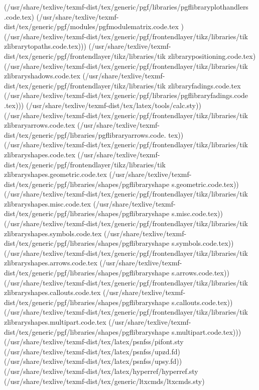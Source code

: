 (/usr/share/texlive/texmf-dist/tex/generic/pgf/libraries/pgflibraryplothandlers
.code.tex)
(/usr/share/texlive/texmf-dist/tex/generic/pgf/modules/pgfmodulematrix.code.tex
)
(/usr/share/texlive/texmf-dist/tex/generic/pgf/frontendlayer/tikz/libraries/tik
zlibrarytopaths.code.tex)))
(/usr/share/texlive/texmf-dist/tex/generic/pgf/frontendlayer/tikz/libraries/tik
zlibrarypositioning.code.tex)
(/usr/share/texlive/texmf-dist/tex/generic/pgf/frontendlayer/tikz/libraries/tik
zlibraryshadows.code.tex
(/usr/share/texlive/texmf-dist/tex/generic/pgf/frontendlayer/tikz/libraries/tik
zlibraryfadings.code.tex
(/usr/share/texlive/texmf-dist/tex/generic/pgf/libraries/pgflibraryfadings.code
.tex))) (/usr/share/texlive/texmf-dist/tex/latex/tools/calc.sty))
(/usr/share/texlive/texmf-dist/tex/generic/pgf/frontendlayer/tikz/libraries/tik
zlibraryarrows.code.tex
(/usr/share/texlive/texmf-dist/tex/generic/pgf/libraries/pgflibraryarrows.code.
tex))
(/usr/share/texlive/texmf-dist/tex/generic/pgf/frontendlayer/tikz/libraries/tik
zlibraryshapes.code.tex
(/usr/share/texlive/texmf-dist/tex/generic/pgf/frontendlayer/tikz/libraries/tik
zlibraryshapes.geometric.code.tex
(/usr/share/texlive/texmf-dist/tex/generic/pgf/libraries/shapes/pgflibraryshape
s.geometric.code.tex))
(/usr/share/texlive/texmf-dist/tex/generic/pgf/frontendlayer/tikz/libraries/tik
zlibraryshapes.misc.code.tex
(/usr/share/texlive/texmf-dist/tex/generic/pgf/libraries/shapes/pgflibraryshape
s.misc.code.tex))
(/usr/share/texlive/texmf-dist/tex/generic/pgf/frontendlayer/tikz/libraries/tik
zlibraryshapes.symbols.code.tex
(/usr/share/texlive/texmf-dist/tex/generic/pgf/libraries/shapes/pgflibraryshape
s.symbols.code.tex))
(/usr/share/texlive/texmf-dist/tex/generic/pgf/frontendlayer/tikz/libraries/tik
zlibraryshapes.arrows.code.tex
(/usr/share/texlive/texmf-dist/tex/generic/pgf/libraries/shapes/pgflibraryshape
s.arrows.code.tex))
(/usr/share/texlive/texmf-dist/tex/generic/pgf/frontendlayer/tikz/libraries/tik
zlibraryshapes.callouts.code.tex
(/usr/share/texlive/texmf-dist/tex/generic/pgf/libraries/shapes/pgflibraryshape
s.callouts.code.tex))
(/usr/share/texlive/texmf-dist/tex/generic/pgf/frontendlayer/tikz/libraries/tik
zlibraryshapes.multipart.code.tex
(/usr/share/texlive/texmf-dist/tex/generic/pgf/libraries/shapes/pgflibraryshape
s.multipart.code.tex)))
(/usr/share/texlive/texmf-dist/tex/latex/psnfss/pifont.sty
(/usr/share/texlive/texmf-dist/tex/latex/psnfss/upzd.fd)
(/usr/share/texlive/texmf-dist/tex/latex/psnfss/upsy.fd))
(/usr/share/texlive/texmf-dist/tex/latex/hyperref/hyperref.sty
(/usr/share/texlive/texmf-dist/tex/generic/ltxcmds/ltxcmds.sty)
